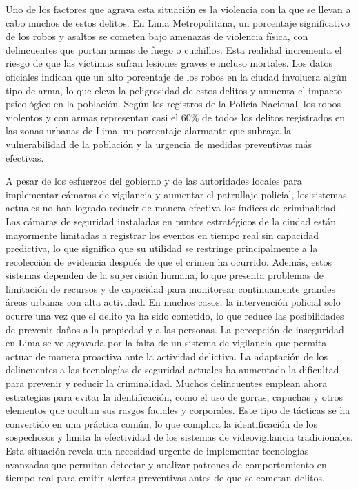 \documentclass[listof=nochaptergap,12pt,times,authoryear]{report}
\begin{document}
Uno de los factores que agrava esta situación es la violencia con la que se llevan a cabo muchos de estos delitos. En Lima Metropolitana, un porcentaje significativo de los robos y asaltos se cometen bajo amenazas de violencia física, con delincuentes que portan armas de fuego o cuchillos. Esta realidad incrementa el riesgo de que las víctimas sufran lesiones graves e incluso mortales. Los datos oficiales indican que un alto porcentaje de los robos en la ciudad involucra algún tipo de arma, lo que eleva la peligrosidad de estos delitos y aumenta el impacto psicológico en la población. Según los registros de la Policía Nacional, los robos violentos y con armas representan casi el 60\%  de todos los delitos registrados en las zonas urbanas de Lima, un porcentaje alarmante que subraya la vulnerabilidad de la población y la urgencia de medidas preventivas más efectivas.

A pesar de los esfuerzos del gobierno y de las autoridades locales para implementar cámaras de vigilancia y aumentar el patrullaje policial, los sistemas actuales no han logrado reducir de manera efectiva los índices de criminalidad. Las cámaras de seguridad instaladas en puntos estratégicos de la ciudad están mayormente limitadas a registrar los eventos en tiempo real sin capacidad predictiva, lo que significa que su utilidad se restringe principalmente a la recolección de evidencia después de que el crimen ha ocurrido. Además, estos sistemas dependen de la supervisión humana, lo que presenta problemas de limitación de recursos y de capacidad para monitorear continuamente grandes áreas urbanas con alta actividad. En muchos casos, la intervención policial solo ocurre una vez que el delito ya ha sido cometido, lo que reduce las posibilidades de prevenir daños a la propiedad y a las personas.
La percepción de inseguridad en Lima se ve agravada por la falta de un sistema de vigilancia que permita actuar de manera proactiva ante la actividad delictiva. La adaptación de los delincuentes a las tecnologías de seguridad actuales ha aumentado la dificultad para prevenir y reducir la criminalidad. Muchos delincuentes emplean ahora estrategias para evitar la identificación, como el uso de gorras, capuchas y otros elementos que ocultan sus rasgos faciales y corporales. Este tipo de tácticas se ha convertido en una práctica común, lo que complica la identificación de los sospechosos y limita la efectividad de los sistemas de videovigilancia tradicionales. Esta situación revela una necesidad urgente de implementar tecnologías avanzadas que permitan detectar y analizar patrones de comportamiento en tiempo real para emitir alertas preventivas antes de que se cometan delitos.
\end{document}
